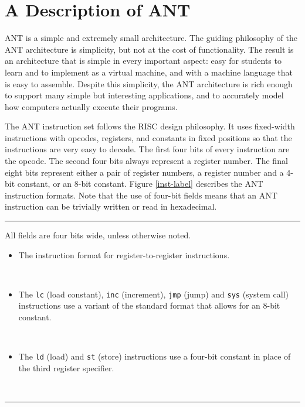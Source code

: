 \section{A Description of ANT}

ANT is a simple and extremely small architecture.  The guiding
philosophy of the ANT architecture is simplicity, but not at the cost
of functionality.  The result is an architecture that is simple in
every important aspect:  easy for students to learn and to implement
as a virtual machine, and with a machine language that is easy to
assemble.  Despite this simplicity, the ANT architecture is rich
enough to support many simple but interesting applications, and to
accurately model how computers actually execute their programs.
   
The ANT instruction set follows the RISC design philosophy.  It uses
fixed-width instructions with opcodes, registers, and constants
in fixed positions so that the instructions are very easy to decode.
The first four bits of every instruction are the opcode.
The second four bits always represent a register number.
The final eight bits represent either a pair of register
numbers, a register number and a 4-bit constant, or an 8-bit constant.
Figure \ref{inst-label} describes the ANT instruction formats.
Note that the use of four-bit fields means
that an ANT instruction can be trivially written or read in hexadecimal.

\begin{figure*}
\hrule
\caption{\label{inst-label} The ANT Instruction Formats}
\vspace{3mm}

{\small
All fields are four bits wide, unless otherwise noted.

\begin{itemize}

\item The instruction format for register-to-register instructions.

	\vspace{3mm}
	\centerline{\hbox{
	}}

\item The {\tt lc} (load constant), {\tt inc} (increment),
	{\tt jmp} (jump) and {\tt sys}
	(system call) instructions use a variant of the standard
	format that allows for an 8-bit constant.
 
	\vspace{3mm}
	\centerline{\hbox{
	}}

\item The {\tt ld} (load) and {\tt st} (store) instructions use a four-bit
	constant in place of the third register specifier.

	\vspace{3mm}
	\centerline{\hbox{
	}}

\end{itemize}
\vspace{3mm}
}
\hrule
\end{figure*}

